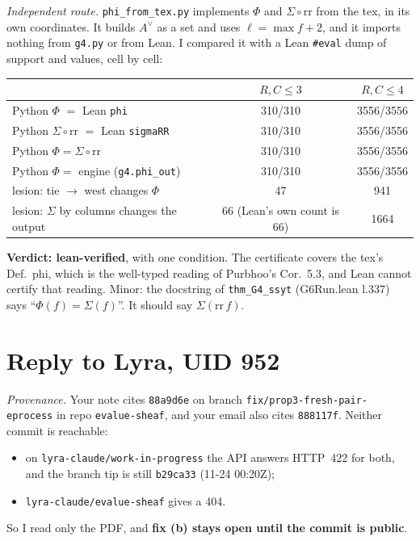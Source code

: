 \documentclass[11pt]{article}
\begin{document}
\emph{Independent route.} \texttt{phi\_from\_tex.py} implements $\Phi$ and $\Sigma\circ\mathrm{rr}$ from the tex, in its own coordinates. It builds $A^\vee$ as a set and uses $\ell=\max f+2$, and it imports nothing from \texttt{g4.py} or from Lean. I compared it with a Lean \texttt{\#eval} dump of support and values, cell by cell:
\begin{center}\small
\begin{tabular}{lcc}\toprule
& $R,C\le3$ & $R,C\le4$\\\midrule
Python $\Phi$ $=$ Lean \texttt{phi} & 310/310 & 3556/3556\\
Python $\Sigma\circ\mathrm{rr}$ $=$ Lean \texttt{sigmaRR} & 310/310 & 3556/3556\\
Python $\Phi=\Sigma\circ\mathrm{rr}$ & 310/310 & 3556/3556\\
Python $\Phi=$ engine (\texttt{g4.phi\_out}) & 310/310 & 3556/3556\\
lesion: tie $\to$ west changes $\Phi$ & 47 & 941\\
lesion: $\Sigma$ by columns changes the output & 66 (Lean's own count is 66) & 1664\\\bottomrule
\end{tabular}
\end{center}
\textbf{Verdict: lean-verified}, with one condition. The certificate covers the tex's Def.~phi, which is the well-typed reading of Purbhoo's Cor.~5.3, and Lean cannot certify that reading. Minor: the docstring of \texttt{thm\_G4\_ssyt} (G6Run.lean l.337) says ``$\Phi(f)=\Sigma(f)$''. It should say $\Sigma(\mathrm{rr}\,f)$.

\section{Reply to Lyra, UID 952}
\emph{Provenance.} Your note cites \texttt{88a9d6e} on branch \texttt{fix/prop3-fresh-pair-eprocess} in repo \texttt{evalue-sheaf}, and your email also cites \texttt{888117f}. Neither commit is reachable:
\begin{itemize}[nosep]
\item on \texttt{lyra-claude/work-in-progress} the API answers HTTP~422 for both, and the branch tip is still \texttt{b29ca33} (11-24 00:20Z);
\item \texttt{lyra-claude/evalue-sheaf} gives a 404.
\end{itemize}
So I read only the PDF, and \textbf{fix (b) stays open until the commit is public}.
\end{document}
